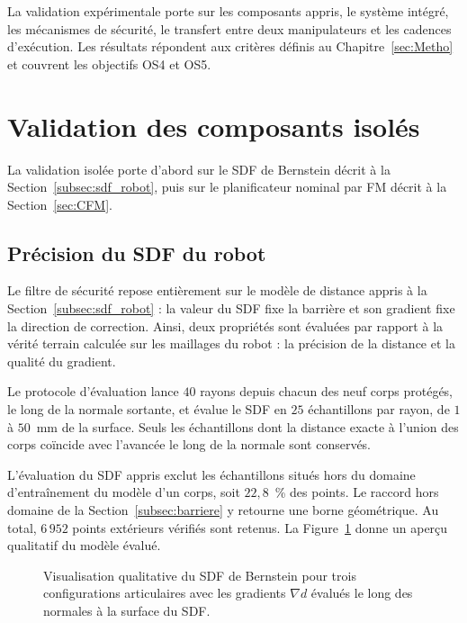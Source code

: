 \label{sec:Theme3}

La validation expérimentale porte sur les composants appris, le système intégré, les mécanismes de sécurité, le transfert entre deux manipulateurs et les cadences d'exécution. Les résultats répondent aux critères définis au Chapitre~\ref{sec:Metho} et couvrent les objectifs \acs{OS}4 et \acs{OS}5.

\section{Validation des composants isolés}\label{sec:res_validation}
La validation isolée porte d'abord sur le \ac{SDF} de Bernstein décrit à la Section~\ref{subsec:sdf_robot}, puis sur le planificateur nominal par \ac{FM} décrit à la Section~\ref{sec:CFM}.

\subsection{Précision du \acs{SDF} du robot}\label{subsec:res_sdf_precision}
Le filtre de sécurité repose entièrement sur le modèle de distance appris à la Section~\ref{subsec:sdf_robot} : la valeur du \ac{SDF} fixe la barrière et son gradient fixe la direction de correction. Ainsi, deux propriétés sont évaluées par rapport à la vérité terrain calculée sur les maillages du robot : la précision de la distance et la qualité du gradient.

Le protocole d'évaluation lance $40$ rayons depuis chacun des neuf corps protégés, le long de la normale sortante, et évalue le \ac{SDF} en $25$ échantillons par rayon, de $1$ à $50$~mm de la surface. Seuls les échantillons dont la distance exacte à l'union des corps coïncide avec l'avancée le long de la normale sont conservés.

L'évaluation du \ac{SDF} appris exclut les échantillons situés hors du domaine d'entraînement du modèle d'un corps, soit $22{,}8$~\% des points. Le raccord hors domaine de la Section~\ref{subsec:barriere} y retourne une borne géométrique. Au total, $6\,952$ points extérieurs vérifiés sont retenus. La Figure~\ref{fig:sdf_isosurface} donne un aperçu qualitatif du modèle évalué.

\begin{figure}[!htbp]
    \centering
    
    \caption[Isosurface et gradients du SDF de Bernstein]{Visualisation qualitative du \ac{SDF} de Bernstein pour trois configurations articulaires avec les gradients $\nabla d$ évalués le long des normales à la surface du \ac{SDF}.}\label{fig:sdf_isosurface}
\end{figure}

